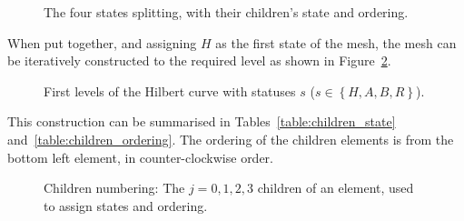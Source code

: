 \begin{figure}[H]
	\centering
	\hfill
	\hfill
	\hfill
	\caption{The four states splitting, with their children's state and ordering.}
	\label{fig:hilbert_splits}
\end{figure}

When put together, and assigning $H$ as the first state of the mesh, the mesh can be iteratively
constructed to the required level as shown in Figure~\ref{fig:hilbert_levels}.

\begin{figure}[H]
	\centering
	\subfloat[Level 0]
	{ \label{fig:hilbert_l0}}
	\hfill
	\subfloat[Level 1]
	{ \label{fig:hilbert_l1}}
	\hfill
	\subfloat[Level 2]
	{ \label{fig:hilbert_l2}}
	\caption{First levels of the Hilbert curve with statuses $s$ ($s \in \left \{ H, A , B , R \right \}$).}
	\label{fig:hilbert_levels}
\end{figure}

This construction can be summarised in Tables~\ref{table:children_state}
and~\ref{table:children_ordering}. The ordering of the children elements is from the bottom left
element, in counter-clockwise order. 

\begin{figure}[H]
	\centering
	
	\caption{Children numbering: The $j = 0, 1, 2, 3$ children of an element, used to assign states and ordering.}
	\label{fig:child_order}
\end{figure}

